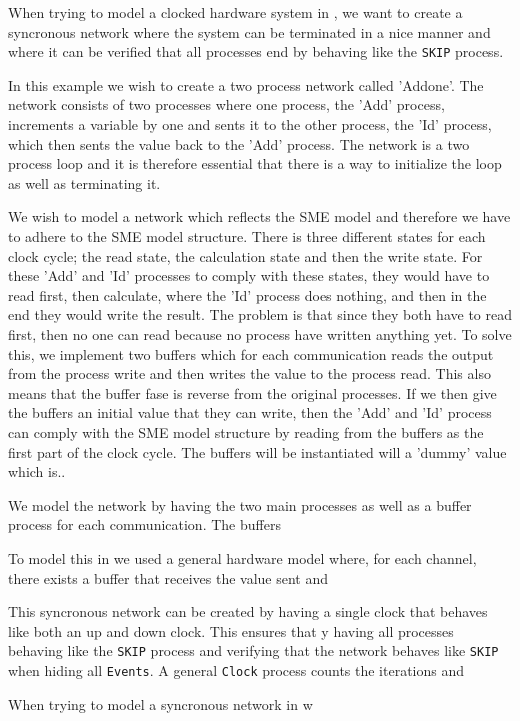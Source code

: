 
When trying to model a clocked hardware system in \csp, we want to create a syncronous network where the system can be terminated in a nice manner and where it can be verified that all processes end by behaving like the \texttt{SKIP} process.

In this example we wish to create a two process network called 'Addone'. The network consists of two processes where one process, the 'Add' process, increments a variable by one and sents it to the other process, the 'Id' process, which then sents the value back to the 'Add' process.
The network is a two process loop and it is therefore essential that there is a way to initialize the loop as well as terminating it.

We wish to model a \cspm network which reflects the SME model and therefore we have to adhere to the SME model structure. There is three different states for each clock cycle; the read state, the calculation state and then the write state. For these 'Add' and 'Id' processes to comply with these states, they would have to read first, then calculate, where the 'Id' process does nothing, and then in the end they would write the result. The problem is that since they both have to read first, then no one can read because no process have written anything yet.
To solve this, we implement two buffers which for each communication reads the output from the process write and then writes the value to the process read. This also means that the buffer fase is reverse from the original processes.
If we then give the buffers an initial value that they can write, then the 'Add' and 'Id' process can comply with the SME model structure by reading from the buffers as the first part of the clock cycle.
The buffers will be instantiated will a 'dummy' value which is.. 


We model the network by having the two main processes as well as a buffer process for each communication. The buffers

To model this in \cspm we used a general hardware model where, for each channel, there exists a buffer that receives the value sent and

This syncronous network can be created by having a single clock that behaves like both an up and down clock. This ensures that
y having all processes behaving like the \texttt{SKIP} process and verifying that the network behaves like \texttt{SKIP} when hiding all \texttt{Events}.
A general \texttt{Clock} process counts the iterations and

When trying to model a syncronous network in \cspm w